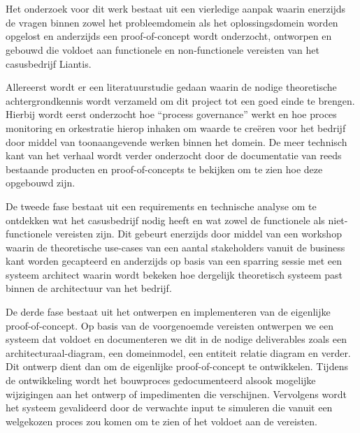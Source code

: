 
\chapter{}%
\label{ch:onderzoeksmethode}

Het onderzoek voor dit werk bestaat uit een vierledige aanpak waarin enerzijds de vragen binnen zowel het probleemdomein als het oplossingsdomein worden opgelost en anderzijds een proof-of-concept wordt onderzocht, ontworpen en gebouwd die voldoet aan functionele en non-functionele vereisten van het casusbedrijf Liantis. \newline

Allereerst wordt er een literatuurstudie gedaan waarin de nodige theoretische achtergrondkennis wordt verzameld om dit project tot een goed einde te brengen. Hierbij wordt eerst onderzocht hoe “process governance” werkt en hoe proces monitoring en orkestratie hierop inhaken om waarde te creëren voor het bedrijf door middel van toonaangevende werken binnen het domein. De meer technisch kant van het verhaal wordt verder onderzocht door de documentatie van reeds bestaande producten en proof-of-concepts te bekijken om te zien hoe deze opgebouwd zijn.\newline

De tweede fase bestaat uit een requirements en technische analyse om te ontdekken wat het casusbedrijf nodig heeft en wat zowel de functionele als niet-functionele vereisten zijn. Dit gebeurt enerzijds door middel van een workshop waarin de theoretische use-cases van een aantal stakeholders vanuit de business kant worden gecapteerd en anderzijds op basis van een sparring sessie met een systeem architect waarin wordt bekeken hoe dergelijk theoretisch systeem past binnen de architectuur van het bedrijf.\newline

De derde fase bestaat uit het ontwerpen en implementeren van de eigenlijke proof-of-concept. Op basis van de voorgenoemde vereisten ontwerpen we een systeem dat voldoet en documenteren we dit in de nodige deliverables zoals een architecturaal-diagram, een domeinmodel, een entiteit relatie diagram en verder. Dit ontwerp dient dan om de eigenlijke proof-of-concept te ontwikkelen. Tijdens de ontwikkeling wordt het bouwproces gedocumenteerd alsook mogelijke wijzigingen aan het ontwerp of impedimenten die verschijnen. Vervolgens wordt het systeem gevalideerd door de verwachte input te simuleren die vanuit een welgekozen proces zou komen om te zien of het voldoet aan de vereisten. \newline

